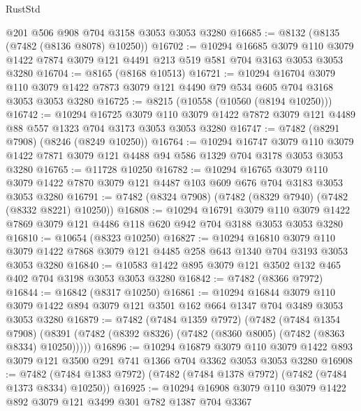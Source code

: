 \begin{lexlean}{RustStd}
\begin{coremodule}
    @201
    @506
    @908
    @704
    @3158
    @3053
    @3053
    @3280
@16685 := @8132 (@8135 (@7482 (@8136 @8078) @10250))
@16702 := @10294
    @16685
    @3079
    @110
    @3079
    @1422
    @7874
    @3079
    @121
    @4491
    @213
    @519
    @581
    @704
    @3163
    @3053
    @3053
    @3280
@16704 := @8165 (@8168 @10513)
@16721 := @10294
    @16704
    @3079
    @110
    @3079
    @1422
    @7873
    @3079
    @121
    @4490
    @79
    @534
    @605
    @704
    @3168
    @3053
    @3053
    @3280
@16725 := @8215 (@10558 (@10560 (@8194 @10250)))
@16742 := @10294
    @16725
    @3079
    @110
    @3079
    @1422
    @7872
    @3079
    @121
    @4489
    @88
    @557
    @1323
    @704
    @3173
    @3053
    @3053
    @3280
@16747 := @7482 (@8291 @7908) (@8246 (@8249 @10250))
@16764 := @10294
    @16747
    @3079
    @110
    @3079
    @1422
    @7871
    @3079
    @121
    @4488
    @94
    @586
    @1329
    @704
    @3178
    @3053
    @3053
    @3280
@16765 := @11728 @10250
@16782 := @10294
    @16765
    @3079
    @110
    @3079
    @1422
    @7870
    @3079
    @121
    @4487
    @103
    @609
    @676
    @704
    @3183
    @3053
    @3053
    @3280
@16791 := @7482 (@8324 @7908) (@7482 (@8329 @7940) (@7482 (@8332 @8221) @10250))
@16808 := @10294
    @16791
    @3079
    @110
    @3079
    @1422
    @7869
    @3079
    @121
    @4486
    @118
    @620
    @942
    @704
    @3188
    @3053
    @3053
    @3280
@16810 := @10654 (@8323 @10250)
@16827 := @10294
    @16810
    @3079
    @110
    @3079
    @1422
    @7868
    @3079
    @121
    @4485
    @258
    @643
    @1340
    @704
    @3193
    @3053
    @3053
    @3280
@16840 := @10583 @1422 @895 @3079 @121 @3502 @132 @465 @402 @704 @3198 @3053 @3053 @3280
@16842 := @7482 (@8366 @7972)
@16844 := @16842 (@8317 @10250)
@16861 := @10294
    @16844
    @3079
    @110
    @3079
    @1422
    @894
    @3079
    @121
    @3501
    @162
    @664
    @1347
    @704
    @3489
    @3053
    @3053
    @3280
@16879 := @7482
    (@7484 @1359 @7972)
    (@7482
      (@7484 @1354 @7908)
      (@8391 (@7482 (@8392 @8326) (@7482 (@8360 @8005) (@7482 (@8363 @8334) @10250)))))
@16896 := @10294
    @16879
    @3079
    @110
    @3079
    @1422
    @893
    @3079
    @121
    @3500
    @291
    @741
    @1366
    @704
    @3362
    @3053
    @3053
    @3280
@16908 := @7482 (@7484 @1383 @7972) (@7482 (@7484 @1378 @7972) (@7482 (@7484 @1373 @8334) @10250))
@16925 := @10294
    @16908
    @3079
    @110
    @3079
    @1422
    @892
    @3079
    @121
    @3499
    @301
    @782
    @1387
    @704
    @3367

\end{coremodule}
\end{lexlean}
